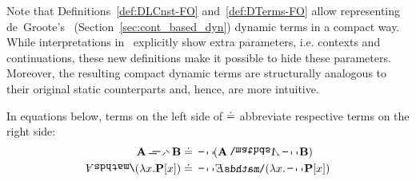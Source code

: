 Note that Definitions~\ref{def:DLCnst-FO} and~\ref{def:DTerms-FO} allow representing de~Groote's~\cite{deGroote:2006:Towards-a-Montagovian-Account-of-Dynamics} (Section~\ref{sec:cont_based_dyn}) dynamic terms in a compact way.  While interpretations in~\cite{deGroote:2006:Towards-a-Montagovian-Account-of-Dynamics} explicitly show extra parameters, i.e. contexts and continuations, these new definitions make it possible to hide these parameters. Moreover, the resulting compact dynamic terms are structurally analogous to their original static counterparts and, hence, are more intuitive.

\begin{remark} In equations below, terms on the left side of $\doteq$ abbreviate respective terms on the right side:
\begin{align} 
\A2 \imp2 \B2 \defeq \ & \n2 (\A2 \cnj2 \n2 \B2) \\
\all2( \lambda \x1. \P2[\x1]) \defeq \ & \n2 \ex2 ( \lambda \x1. \n2 \P2 [\x1] )
\end{align}
\end{remark}


